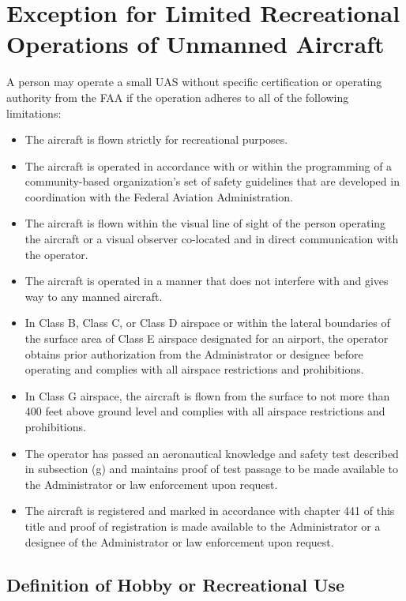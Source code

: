 \documentclass[
]{book}
\providecommand{\tightlist}{%
  \setlength{\itemsep}{0pt}\setlength{\parskip}{0pt}}
\begin{document}
\hypertarget{s-recreation}{%
\section{Exception for Limited Recreational Operations of Unmanned Aircraft}\label{s-recreation}}

A person may operate a small UAS without specific certification or operating authority from the FAA if the operation adheres to all of the following limitations:

\begin{itemize}
\tightlist
\item
  The aircraft is flown strictly for recreational purposes.
\item
  The aircraft is operated in accordance with or within the programming of a community-based organization's set of safety guidelines that are developed in coordination with the Federal Aviation Administration.
\item
  The aircraft is flown within the visual line of sight of the person operating the aircraft or a visual observer co-located and in direct communication with the operator.
\item
  The aircraft is operated in a manner that does not interfere with and gives way to any manned aircraft.
\item
  In Class B, Class C, or Class D airspace or within the lateral boundaries of the surface area of Class E airspace designated for an airport, the operator obtains prior authorization from the Administrator or designee before operating and complies with all airspace restrictions and prohibitions.
\item
  In Class G airspace, the aircraft is flown from the surface to not more than 400 feet above ground level and complies with all airspace restrictions and prohibitions.
\item
  The operator has passed an aeronautical knowledge and safety test described in subsection (g) and maintains proof of test passage to be made available to the Administrator or law enforcement upon request.
\item
  The aircraft is registered and marked in accordance with chapter 441 of this title and proof of registration is made available to the Administrator or a designee of the Administrator or law enforcement upon request.
\end{itemize}

\hypertarget{definition-of-hobby-or-recreational-use}{%
\subsection{Definition of Hobby or Recreational Use}\label{definition-of-hobby-or-recreational-use}}
\end{document}
